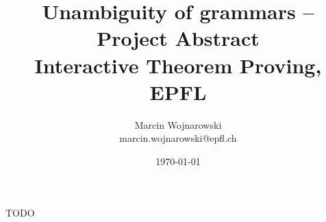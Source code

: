 \documentclass[notitlepage]{article}
\title{Unambiguity of grammars -- Project Abstract \\\large Interactive Theorem Proving, EPFL}
\author{Marcin Wojnarowski \\ \normalsize marcin.wojnarowski@epfl.ch}
\date{\today}
\begin{document}
\maketitle

TODO

\printbibliography
\end{document}
